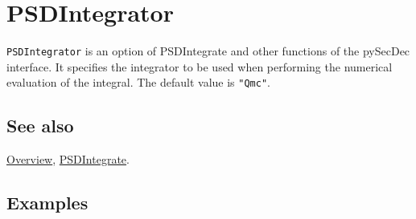 \documentclass[../FeynHelpersManual.tex]{subfiles}
\begin{document}
\hypertarget{psdintegrator}{
\section{PSDIntegrator}\label{psdintegrator}}

\texttt{PSDIntegrator} is an option of PSDIntegrate and other functions
of the pySecDec interface. It specifies the integrator to be used when
performing the numerical evaluation of the integral. The default value
is \texttt{"Qmc"}.

\subsection{See also}

\hyperlink{toc}{Overview}, \hyperlink{psdintegrate}{PSDIntegrate}.

\subsection{Examples}
\end{document}
